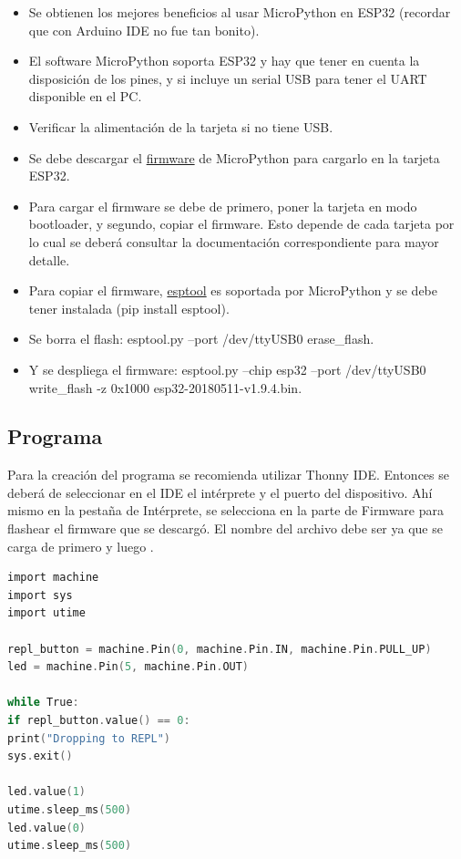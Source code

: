 \documentclass[conference]{IEEEtran}
\begin{document}
\begin{itemize}
\item Se obtienen los mejores beneficios al usar MicroPython en ESP32 (recordar que con Arduino IDE no fue tan bonito).

\item El software MicroPython soporta ESP32 y hay que tener en cuenta la disposición de los pines, y si incluye un serial USB para tener el UART disponible en el PC.

\item Verificar la alimentación de la tarjeta si no tiene USB.

\item Se debe descargar el \href{https://micropython.org/download/#esp32}{firmware} de MicroPython para cargarlo en la tarjeta ESP32.

\item Para cargar el firmware se debe de primero, poner la tarjeta en modo bootloader, y segundo, copiar el firmware. Esto depende de cada tarjeta por lo cual se deberá consultar la documentación correspondiente para mayor detalle.

\item Para copiar el firmware, \href{https://github.com/espressif/esptool}{esptool} es soportada por MicroPython y se debe tener instalada (pip install esptool).

\item Se borra el flash: esptool.py --port /dev/ttyUSB0 erase\_flash.

\item Y se despliega el firmware: esptool.py --chip esp32 --port /dev/ttyUSB0 write\_flash -z 0x1000 esp32-20180511-v1.9.4.bin.
\end{itemize}

\subsection{Programa}

Para la creación del programa se recomienda utilizar Thonny IDE. Entonces se deberá de seleccionar en el IDE el intérprete y el puerto del dispositivo. Ahí mismo en la pestaña de Intérprete, se selecciona en la parte de Firmware para flashear el firmware que se descargó. El nombre del archivo debe ser  ya que se carga  de primero y luego .

\bigbreak

\begin{lstlisting}[language=C, caption={Programa que hace parpadear un LED hasta que se presiona el botón de salir en MicroPython. Fuente: Sparkfun Electronics \cite{hymel}.}]
import machine
import sys
import utime

repl_button = machine.Pin(0, machine.Pin.IN, machine.Pin.PULL_UP)
led = machine.Pin(5, machine.Pin.OUT)

while True:
if repl_button.value() == 0:
print("Dropping to REPL")
sys.exit()

led.value(1)
utime.sleep_ms(500)
led.value(0)
utime.sleep_ms(500)
\end{lstlisting}
\end{document}

